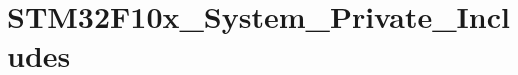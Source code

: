 \hypertarget{group___s_t_m32_f10x___system___private___includes}{}\section{S\+T\+M32\+F10x\+\_\+\+System\+\_\+\+Private\+\_\+\+Includes}
\label{group___s_t_m32_f10x___system___private___includes}
